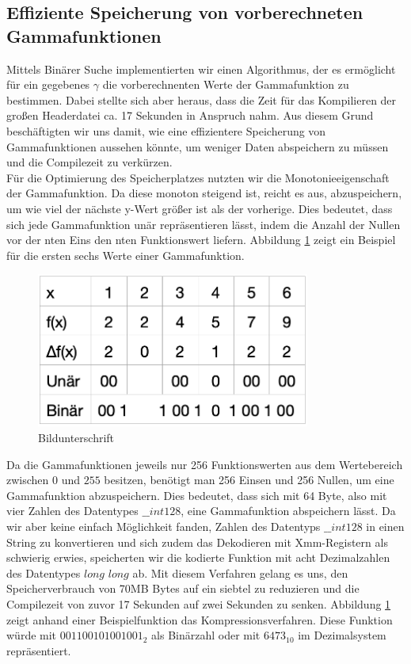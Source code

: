 \documentclass[course=erap]{aspdoc}
\begin{document}
	\subsection{Effiziente Speicherung von vorberechneten Gammafunktionen}
	Mittels Binärer Suche implementierten wir einen Algorithmus, der es ermöglicht für ein gegebenes $\gamma$ die vorberechnenten Werte der Gammafunktion zu bestimmen.  Dabei stellte sich aber heraus, dass die Zeit für das Kompilieren der großen Headerdatei ca. 17 Sekunden in Anspruch nahm. Aus diesem Grund beschäftigten wir uns damit, wie eine effizientere Speicherung von Gammafunktionen aussehen könnte, um weniger Daten abspeichern zu müssen und die Compilezeit zu verkürzen.
	\\
	\newline
	\noindent
	Für die Optimierung des Speicherplatzes nutzten wir die Monotonieeigenschaft der Gammafunktion. Da diese monoton steigend ist, reicht es aus, abzuspeichern, um wie viel der nächste y-Wert größer ist als der vorherige. Dies bedeutet, dass sich jede Gammafunktion unär repräsentieren lässt, indem die Anzahl der Nullen vor der nten Eins den nten Funktionswert liefern. Abbildung \ref{KompremierungBeispiel} zeigt ein Beispiel für die ersten sechs Werte einer Gammafunktion. 
	
	\noindent
	\begin{figure}
        \includegraphics[width=9cm]{Images/CompressionOfFunctions.png}
         \caption{Bildunterschrift}
         \label{KompremierungBeispiel}
    \end{figure}
	Da die Gammafunktionen jeweils nur 256 Funktionswerten aus dem Wertebereich zwischen $0$ und $255$ besitzen, benötigt man 256 Einsen und 256 Nullen, um eine Gammafunktion abzuspeichern. Dies bedeutet, dass sich mit 64 Byte, also mit vier Zahlen des Datentypes $\_\_int128$, eine Gammafunktion abspeichern lässt. Da wir aber keine einfach Möglichkeit fanden, Zahlen des Datentyps $\_\_int128$ in einen String zu konvertieren und sich zudem das Dekodieren mit Xmm-Registern als schwierig erwies, speicherten wir die kodierte Funktion mit acht Dezimalzahlen des Datentypes $long$ $long$ ab. Mit diesem Verfahren gelang es uns, den Speicherverbrauch von 70MB Bytes auf ein siebtel zu reduzieren und die Compilezeit von zuvor 17 Sekunden auf zwei Sekunden zu senken. 
	Abbildung \ref{KompremierungBeispiel} zeigt anhand einer Beispielfunktion das Kompressionsverfahren. Diese Funktion würde mit $001100101001001_{2}$ als Binärzahl oder mit $6473_{10}$ im Dezimalsystem repräsentiert. 
\end{document}
